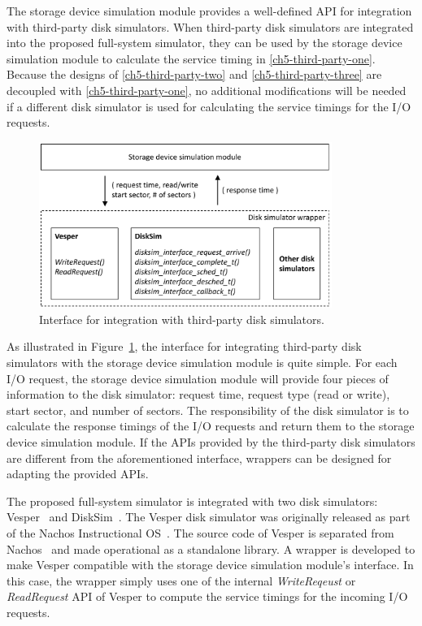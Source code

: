 The storage device simulation module provides a well-defined API for integration with third-party disk simulators. When third-party disk simulators are integrated into the proposed full-system simulator, they can be used by the storage device simulation module to calculate the service timing in \ref{ch5-third-party-one}. Because the designs of \ref{ch5-third-party-two} and \ref{ch5-third-party-three} are decoupled with \ref{ch5-third-party-one}, no additional modifications will be needed if a different disk simulator is used for calculating the service timings for the I/O requests.

\begin{figure}[htpb!]
	\centering
	\includegraphics[width=0.85\textwidth]{figures/ch5-disk-simulator-integration.pdf}
	\caption{\label{fig:ch5-disk-simulator-integration}Interface for integration with third-party disk simulators.}
\end{figure}

As illustrated in Figure~\ref{fig:ch5-disk-simulator-integration}, the interface for integrating third-party disk simulators with the storage device simulation module is quite simple. For each I/O request, the storage device simulation module will provide four pieces of information to the disk simulator: request time, request type (read or write), start sector, and number of sectors. The responsibility of the disk simulator is to calculate the response timings of the I/O requests and return them to the storage device simulation module. If the APIs provided by the third-party disk simulators are different from the aforementioned interface, wrappers can be designed for adapting the provided APIs.

The proposed full-system simulator is integrated with two disk simulators: Vesper~\cite{DeRosa:2006} and DiskSim~\cite{Bucy:2008}. The Vesper disk simulator was originally released as part of the Nachos Instructional OS~\cite{Christopher:1993}. The source code of Vesper is separated from Nachos~\cite{Pearson:2007} and made operational as a standalone library. A wrapper is developed to make Vesper compatible with the storage device simulation module's interface. In this case, the wrapper simply uses one of the internal \textit{WriteReqeust} or \textit{ReadRequest} API of Vesper to compute the service timings for the incoming I/O requests.

